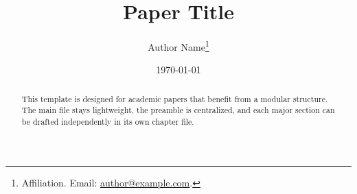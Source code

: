 

\title{Paper Title}
\author{Author Name\thanks{Affiliation. Email: \href{mailto:author@example.com}{author@example.com}.}}
\date{\today}



\maketitle

\begin{abstract}
This template is designed for academic papers that benefit from a modular structure. The main file stays lightweight, the preamble is centralized, and each major section can be drafted independently in its own chapter file.
\end{abstract}

\clearpage








\clearpage



\clearpage
\appendix



